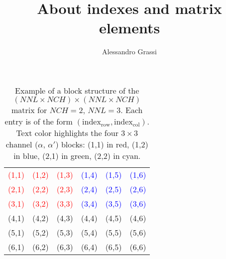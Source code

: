 \documentclass[10pt,a4paper]{article}
\author{Alessandro Grassi}
\title{About indexes and matrix elements}
\begin{document}
	\maketitle
	\begin{table}[b]
		\centering
		\renewcommand{\arraystretch}{1.3}
		\setlength{\tabcolsep}{6pt}
		\begin{tabular}{|ccc|ccc|}
			\hline
			\textcolor{red}{(1,1)} & \textcolor{red}{(1,2)} & \textcolor{red}{(1,3)} & \textcolor{blue}{(1,4)} & \textcolor{blue}{(1,5)} & \textcolor{blue}{(1,6)} \\
			\textcolor{red}{(2,1)} & \textcolor{red}{(2,2)} & \textcolor{red}{(2,3)} & \textcolor{blue}{(2,4)} & \textcolor{blue}{(2,5)} & \textcolor{blue}{(2,6)} \\
			\textcolor{red}{(3,1)} & \textcolor{red}{(3,2)} & \textcolor{red}{(3,3)} & \textcolor{blue}{(3,4)} & \textcolor{blue}{(3,5)} & \textcolor{blue}{(3,6)} \\\hline
			\textcolor{green!60!black}{(4,1)} & \textcolor{green!60!black}{(4,2)} & \textcolor{green!60!black}{(4,3)} & \textcolor{cyan!80!black}{(4,4)} & \textcolor{cyan!80!black}{(4,5)} & \textcolor{cyan!80!black}{(4,6)} \\
			\textcolor{green!60!black}{(5,1)} & \textcolor{green!60!black}{(5,2)} & \textcolor{green!60!black}{(5,3)} & \textcolor{cyan!80!black}{(5,4)} & \textcolor{cyan!80!black}{(5,5)} & \textcolor{cyan!80!black}{(5,6)} \\
			\textcolor{green!60!black}{(6,1)} & \textcolor{green!60!black}{(6,2)} & \textcolor{green!60!black}{(6,3)} & \textcolor{cyan!80!black}{(6,4)} & \textcolor{cyan!80!black}{(6,5)} & \textcolor{cyan!80!black}{(6,6)} \\
			\hline
		\end{tabular}
		\caption{
			Example of a block structure of the $(NNL \times NCH) \times (NNL \times NCH)$ matrix for $NCH=2$, $NNL=3$.
			Each entry is of the form $(\mathrm{index}_\mathrm{row}, \mathrm{index}_\mathrm{col})$.
			Text color highlights the four $3\times3$ channel ($\alpha$, $\alpha'$) blocks: (1,1) in red, (1,2) in blue, (2,1) in green, (2,2) in cyan.
		}
		\label{tab:example}
	\end{table}
	
\end{document}
